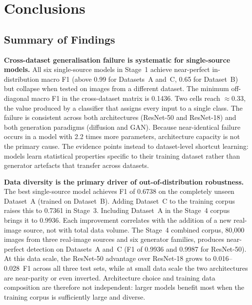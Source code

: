 \chapter{Conclusions}
\label{ch:conclusions}


\section{Summary of Findings}
\label{sec:summary}

\textbf{Cross-dataset generalisation failure is systematic for single-source models.}
All six single-source models in Stage~1 achieve near-perfect in-distribution macro F1
(above 0.99 for Datasets~A and~C, 0.65 for Dataset~B) but collapse when tested on images
from a different dataset. The minimum off-diagonal macro F1 in the cross-dataset matrix is
0.1436. Two cells reach $\approx 0.33$, the value produced by a classifier that assigns
every input to a single class. The failure is consistent across both architectures
(ResNet-50 and ResNet-18) and both generation paradigms (diffusion and GAN). Because
near-identical failure occurs in a model with 2.2 times more parameters, architecture
capacity is not the primary cause. The evidence points instead to dataset-level shortcut
learning: models learn statistical properties specific to their training dataset rather
than generator artefacts that transfer across datasets.

\textbf{Data diversity is the primary driver of out-of-distribution robustness.}
The best single-source model achieves F1 of 0.6738 on the completely unseen Dataset~A
(trained on Dataset~B). Adding Dataset~C to the training corpus raises this to 0.7361 in
Stage~3. Including Dataset~A in the Stage~4 corpus brings it to 0.9936. Each improvement
correlates with the addition of a new real-image source, not with total data volume.
The Stage~4 combined corpus, 80,000 images from three real-image sources and six generator
families, produces near-perfect detection on Datasets~A and~C (F1 of 0.9936 and 0.9987
for ResNet-50). At this data scale, the ResNet-50 advantage over ResNet-18 grows to
0.016--0.028~F1 across all three test sets, while at small data scale the two architectures
are near-parity or even inverted. Architecture choice and training data composition are
therefore not independent: larger models benefit most when the training corpus is
sufficiently large and diverse.

